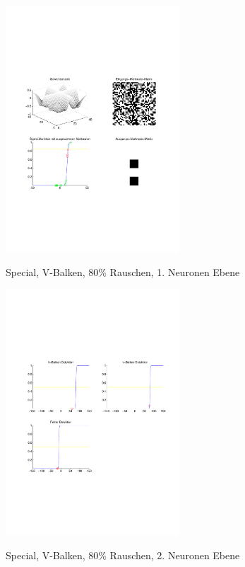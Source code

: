 \begin{figure}[hbt]
	\begin{minipage}[c]{\textwidth}
		\centering
       	\includegraphics[trim=71 213 43 212, clip, width=0.58\textwidth]{./Bilder/Auswertung/Endergebnis/TypeSpecial_Rauschen80_V_Line_Layer1}
		\caption{Special, V-Balken, 80\% Rauschen, 1. Neuronen Ebene}
		\label{Special_V_80_1}
		\vfill
		\includegraphics[trim=71 213 43 212, clip, width=0.58\textwidth]{./Bilder/Auswertung/Endergebnis/TypeSpecial_Rauschen80_V_Line_Layer2}
		\caption{Special, V-Balken, 80\% Rauschen, 2. Neuronen Ebene}
		\label{Special_V_80_2}
	\end{minipage}
\end{figure}
\clearpage

